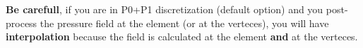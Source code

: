 

\textbf{Be carefull}, if you are in P0+P1 discretization (default option) and you post-process the pressure field at the element (or at the verteces), you will have \textbf{interpolation} because the field is calculated at the element \textbf{and} at the verteces. \\


